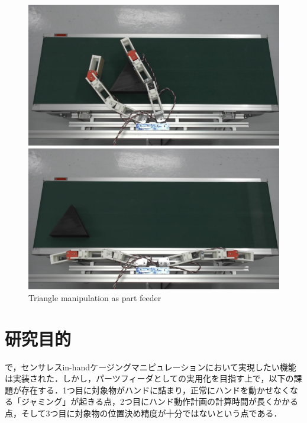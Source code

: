 \documentclass[a4paper,twoside,12pt,papersize, dvipdfmx]{iirthesis}
\begin{document}
\begin{figure}[b]
\begin{minipage}{0.49\hsize}
\subcaption{}
\end{minipage}\\
\begin{minipage}{0.49\hsize}
\centering
\includegraphics[width=\hsize]{fig/Introduction/triangle_Moment_5.jpg}
\subcaption{}
\end{minipage}\hfill
\begin{minipage}{0.49\hsize}
\centering
\includegraphics[width=\hsize]{fig/Introduction/triangle_Moment_7.jpg}
\subcaption{}
\end{minipage}
\caption{Triangle manipulation as part feeder \cite{kamikukita2022}}
\label{fig::intro::trimani}
\end{figure}

\section{研究目的}\label{sec::intro::objective}
\cite{komiyama2021}で，センサレスin-handケージングマニピュレーションにおいて実現したい機能は実装された．しかし，パーツフィーダとしての実用化を目指す上で，以下の課題が存在する．1つ目に対象物がハンドに詰まり，正常にハンドを動かせなくなる「ジャミング」が起きる点，2つ目にハンド動作計画の計算時間が長くかかる点，そして3つ目に対象物の位置決め精度が十分ではないという点である．\par
\end{document}
